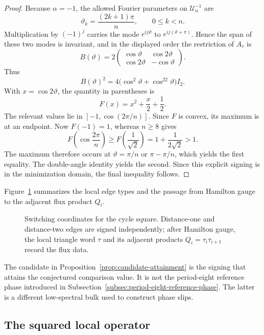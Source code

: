 \begin{proof}
Because \(\alpha=-1\), the allowed Fourier parameters on
\(\mathcal U_n^{-1}\) are
\[
\vartheta_k=\frac{(2k+1)\pi}{n},\qquad 0\leq k<n.
\]
Multiplication by \((-1)^j\) carries the mode \(e^{ij\vartheta}\) to
\(e^{ij(\vartheta+\pi)}\).  Hence the span of these two modes is invariant,
and in the displayed order the restriction of \(A_\tau\) is
\[
B(\vartheta)
=2\begin{pmatrix}
\cos\vartheta&\cos2\vartheta\\
\cos2\vartheta&-\cos\vartheta
\end{pmatrix}.
\]
Thus
\[
B(\vartheta)^2
=4\bigl(\cos^2\vartheta+\cos^22\vartheta\bigr)I_2.
\]
With \(x=\cos2\vartheta\), the quantity in parentheses is
\[
F(x)=x^2+\frac{x}{2}+\frac12.
\]
The relevant values lie in
\([-1,\cos(2\pi/n)]\).  Since \(F\) is convex, its maximum is at an endpoint.
Now \(F(-1)=1\), whereas \(n\geq8\) gives
\[
F\left(\cos\frac{2\pi}{n}\right)
\geq F\left(\frac1{\sqrt2}\right)
=1+\frac1{2\sqrt2}>1.
\]
The maximum therefore occurs at
\(\vartheta=\pi/n\) or \(\pi-\pi/n\), which yields the first equality.
The double-angle identity yields the second.  Since this explicit signing is
in the minimization domain, the final inequality follows.
\end{proof}

Figure~\ref{fig:switching-coordinates} summarizes the local edge types and
the passage from Hamilton gauge to the adjacent flux product \(Q_i\).
\begin{figure}[t]
\centering

\caption{Switching coordinates for the cycle square.  Distance-one and
distance-two edges are signed independently; after Hamilton gauge, the local
triangle word \(\tau\) and its adjacent products \(Q_i=\tau_i\tau_{i+1}\)
record the flux data.}
\label{fig:switching-coordinates}
\end{figure}

The candidate in Proposition~\ref{prop:candidate-attainment} is the signing
that attains the conjectured comparison value.  It is not the period-eight
reference phase introduced in Subsection~\ref{subsec:period-eight-reference-phase}.
The latter is a different low-spectral bulk used to construct phase slips.

\subsection{The squared local operator}
\label{subsec:squared-local-operator}

